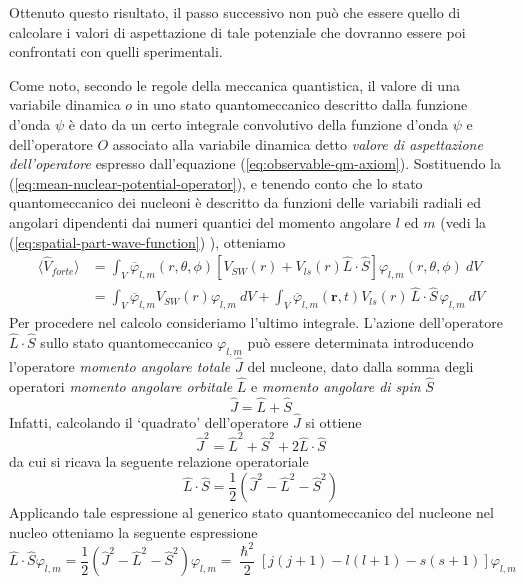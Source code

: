 Ottenuto questo risultato, il passo successivo non può che essere quello di calcolare i valori di aspettazione di tale potenziale che dovranno essere poi confrontati con quelli sperimentali.

Come noto, secondo le regole della meccanica quantistica, il valore di una variabile dinamica $o$ in uno stato quantomeccanico descritto dalla funzione d’onda $\psi$ è dato da un certo integrale convolutivo della funzione d’onda $\psi$ e dell’operatore $O$ associato alla variabile dinamica detto \emph{valore di aspettazione dell’operatore} espresso dall'equazione (\ref{eq:observable-qm-axiom}).
Sostituendo la (\ref{eq:mean-nuclear-potential-operator}), e tenendo conto che lo stato quantomeccanico dei nucleoni è descritto da funzioni delle variabili radiali ed angolari dipendenti dai numeri quantici del momento angolare $l$ ed $m$ (vedi la (\ref{eq:spatial-part-wave-function}) ), otteniamo
\begin{equation}
	\begin{aligned}
		\langle \hat{V}_{forte} \rangle &= \int_{V} \overline{\varphi}_{l,m}(r,\theta,\phi) [V_{SW}(r)+V_{ls}(r) \hat{L} \cdot \hat{S}]\varphi_{l,m}(r,\theta,\phi) \ dV  \\
		&= \int_{V} \overline{\varphi}_{l,m} V_{SW}(r)\varphi_{l,m} \ dV + \int_{V}\overline{\varphi}_{l,m}(\bm{r},t) V_{ls}(r)\, \hat{L} \cdot \hat{S} \, \varphi_{l,m} \ dV
	\end{aligned}
	\label{eq:mean-potential-calc}
\end{equation}
Per procedere nel calcolo consideriamo l’ultimo integrale.
L’azione dell’operatore $\hat{L} \cdot  \hat{S}$ sullo stato quantomeccanico $\varphi_{l,m}$ può essere determinata introducendo l’operatore \emph{momento angolare totale} $\hat{J}$ del nucleone, dato dalla somma degli operatori \emph{momento angolare orbitale} $\hat{L}$ e \emph{momento angolare di spin} $\hat{S}$
\begin{equation}
	\hat{J} = \hat{L} + \hat{S}
	\label{eq:total-angular-momentum-operator}
\end{equation}
Infatti, calcolando il ‘quadrato’ dell’operatore $\hat{J}$ si ottiene
\[
	\hat{J}^{2} = \hat{L}^{2} + \hat{S}^{2} + 2 \hat{L} \cdot \hat{S}
\]
da cui si ricava la seguente relazione operatoriale
\[
	\hat{L} \cdot \hat{S} = \frac{1}{2} (\hat{J}^{2} - \hat{L}^{2} - \hat{S}^{2})
\]
Applicando tale espressione al generico stato quantomeccanico del nucleone nel nucleo otteniamo la seguente espressione
\[
	\hat{L} \cdot \hat{S} \varphi_{l,m} = \frac{1}{2} (\hat{J}^{2} - \hat{L}^{2} - \hat{S}^{2}) \varphi_{l,m} = \frac{\hslash^{2}}{2} [j(j+1) - l(l+1) -s(s+1) ]\varphi_{l,m}
\]
